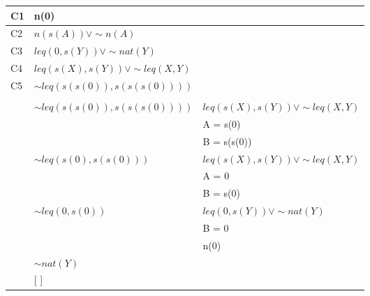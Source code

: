 \documentclass[12pt,runningheads,a4paper]{llncs}
\begin{document}
\begin{tabular}{|C{4cm}|L{6cm}|L{6cm}|}\hline
   C1 & n(0) &\\ \hline
   C2 &  $n(s(A))  \lor   \sim  n(A)$ & \\ \hline
   C3 & $leq(0, s(Y))  \lor   \sim   nat(Y)$ & \\ \hline
   C4 & $leq(s(X), s(Y))  \lor  \sim leq(X,Y)$ & \\ \hline
   C5 & $\sim leq(s(s(0)), s(s(s(0))))$ & \\ \hline
    &  & \\ \hline
    & $\sim leq(s(s(0)), s(s(s(0))))$ & $leq(s(X), s(Y)) \lor \sim leq(X,Y)$\\
    									& & A = s(0)\\ 
    									& & B = s(s(0)) \\ \hline
    & $\sim leq(s(0), s(s(0))) $	  & $leq(s(X), s(Y)) \lor \sim leq(X,Y)$\\
    								    & & A = 0\\
    								    & & B = s(0) \\ \hline
    & $\sim leq(0, s(0))	$		  & $leq(0, s(Y)) \lor \sim nat(Y)$\\
    								   & & B = 0 \\
    								   & & n(0) \\ \hline
    & $\sim nat(Y)$  & \\ \hline
    & [ ] & \\ \hline								   									    
    								     		
   \end{tabular}
\end{document}
